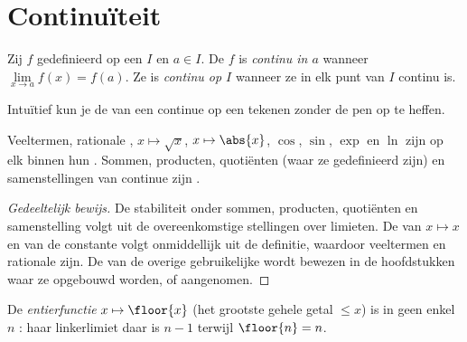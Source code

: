 \section{Continuïteit}

\begin{definition}[Continuïteit]\label{def:g12:limcont:continuity}
Zij $f$ gedefinieerd op een  $I$ en $a \in I$. De  $f$ is
\emph{continu in $a$} wanneer
$\lim\limits_{x \to a} f(x) = f(a)$. Ze is \emph{continu op
$I$} wanneer ze in elk punt van $I$ continu is.
\end{definition}

Intuïtief kun je de  van een continue  op een  tekenen
zonder de pen op te heffen.

\begin{proposition}\label{prop:g12:limcont:usual}
Veeltermen, rationale , $x \mapsto \sqrt{x}$, $x \mapsto \abs{x}$,
$\cos$, $\sin$, $\exp$ en $\ln$ zijn  op elk  binnen hun
. Sommen, producten, quotiënten (waar ze gedefinieerd zijn) en
samenstellingen van continue  zijn .
\end{proposition}

\begin{proof}[Gedeeltelijk bewijs]
De stabiliteit onder sommen, producten, quotiënten en samenstelling volgt uit
de overeenkomstige stellingen over limieten. De  van
$x \mapsto x$ en van de constante  volgt onmiddellijk uit de
definitie, waardoor veeltermen en rationale   zijn. De
 van de overige gebruikelijke  wordt bewezen in de
hoofdstukken waar ze opgebouwd worden, of aangenomen.
\end{proof}

\begin{example}
De \emph{entierfunctie} $x \mapsto \floor{x}$ (het grootste gehele getal
$\leq x$) is in geen enkel  $n$ : haar linkerlimiet daar
is $n - 1$ terwijl $\floor{n} = n$.
\end{example}

